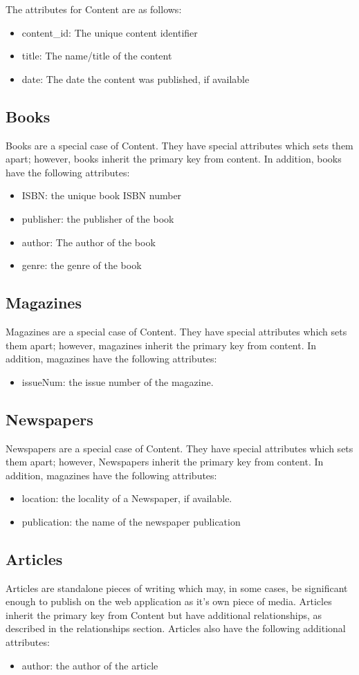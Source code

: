 \documentclass[letter, 12pt, titlepage]{article}
\begin{document}
				The attributes for Content are as follows:
			\begin{itemize}
				\item content\_id: The unique content identifier
				\item title: The name/title of the content
				\item date: The date the content was published, if available
			\end{itemize}
			\subsection{Books}
				Books are a special case of Content. They have special attributes which sets them apart; however, books inherit the primary key from content. In addition, books have the following attributes:
			\begin{itemize}
				\item ISBN: the unique book ISBN number
				\item publisher: the publisher of the book
				\item author: The author of the book
				\item genre: the genre of the book
			\end{itemize}
			\subsection{Magazines}
				Magazines are a special case of Content. They have special attributes which sets them apart; however, magazines inherit the primary key from content. In addition, magazines have the following attributes:
			\begin{itemize}
				\item issueNum: the issue number of the magazine.
			\end{itemize}		
			\subsection{Newspapers} 
				Newspapers are a special case of Content. They have special attributes which sets them apart; however, Newspapers inherit the primary key from content. In addition, magazines have the following attributes:
			\begin{itemize}
				\item location: the locality of a Newspaper, if available.
				\item publication: the name of the newspaper publication
			\end{itemize}	
			\subsection{Articles}		
			Articles are standalone pieces of writing which may, in some cases, be significant enough to publish on the web application as it's own piece of media. Articles inherit the primary key from Content but have additional relationships, as described in the relationships section. Articles also have the following additional attributes:
			\begin{itemize}
				\item author: the author of the article
			\end{itemize}
\end{document}
